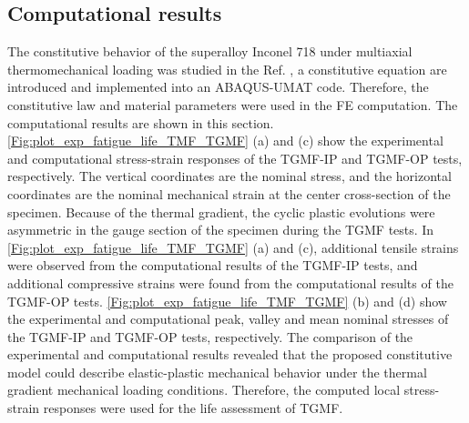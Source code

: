 \documentclass[preprint,5p,twocolumn,11pt,sort&compress]{elsarticle}
\begin{document}
\subsection{Computational results}

The constitutive behavior of the superalloy Inconel 718 under multiaxial thermomechanical loading was studied in the Ref. \cite{SUN201989}, a constitutive equation are introduced and implemented into an ABAQUS-UMAT code. Therefore, the constitutive law and material parameters were used in the FE computation. The computational results are shown in this section. \autoref{Fig:plot_exp_fatigue_life_TMF_TGMF} (a) and (c) show the experimental and computational stress-strain responses of the TGMF-IP and TGMF-OP tests, respectively. The vertical coordinates are the nominal stress, and the horizontal coordinates are the nominal mechanical strain at the center cross-section of the specimen. Because of the thermal gradient, the cyclic plastic evolutions were asymmetric in the gauge section of the specimen during the TGMF tests. In \autoref{Fig:plot_exp_fatigue_life_TMF_TGMF} (a) and (c), additional tensile strains were observed from the computational results of the TGMF-IP tests, and additional compressive strains were found from the computational results of the TGMF-OP tests. \autoref{Fig:plot_exp_fatigue_life_TMF_TGMF} (b) and (d) show the experimental and computational peak, valley and mean nominal stresses of the TGMF-IP and TGMF-OP tests, respectively. The comparison of the experimental and computational results revealed that the proposed constitutive model could describe elastic-plastic mechanical behavior under the thermal gradient mechanical loading conditions. Therefore, the computed local stress-strain responses were used for the life assessment of TGMF.
\end{document}
